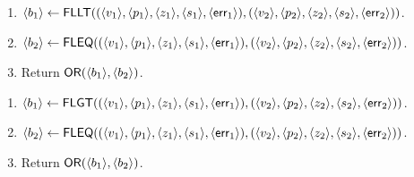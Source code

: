 \begin{enumerate}
\item $\langle b_1 \rangle \leftarrow \mathsf{FLLT}(
        (\langle v_1 \rangle,\langle p_1 \rangle,\langle z_1 \rangle,\langle s_1 \rangle,\langle \mathsf{err}_1 \rangle),
        (\langle v_2 \rangle,\langle p_2 \rangle,\langle z_2 \rangle,\langle s_2 \rangle,\langle \mathsf{err}_2 \rangle))$.
\item $\langle b_2 \rangle \leftarrow \mathsf{FLEQ}(
        (\langle v_1 \rangle,\langle p_1 \rangle,\langle z_1 \rangle,\langle s_1 \rangle,\langle \mathsf{err}_1 \rangle),
        (\langle v_2 \rangle,\langle p_2 \rangle,\langle z_2 \rangle,\langle s_2 \rangle,\langle \mathsf{err}_2 \rangle))$.
\item Return $\mathsf{OR}(\langle b_1 \rangle,\langle b_2 \rangle)$.
\end{enumerate}

\begin{enumerate}
\item $\langle b_1 \rangle \leftarrow \mathsf{FLGT}(
        (\langle v_1 \rangle,\langle p_1 \rangle,\langle z_1 \rangle,\langle s_1 \rangle,\langle \mathsf{err}_1 \rangle),
        (\langle v_2 \rangle,\langle p_2 \rangle,\langle z_2 \rangle,\langle s_2 \rangle,\langle \mathsf{err}_2 \rangle))$.
\item $\langle b_2 \rangle \leftarrow \mathsf{FLEQ}(
        (\langle v_1 \rangle,\langle p_1 \rangle,\langle z_1 \rangle,\langle s_1 \rangle,\langle \mathsf{err}_1 \rangle),
        (\langle v_2 \rangle,\langle p_2 \rangle,\langle z_2 \rangle,\langle s_2 \rangle,\langle \mathsf{err}_2 \rangle))$.
\item Return $\mathsf{OR}(\langle b_1 \rangle,\langle b_2 \rangle)$.
\end{enumerate}



